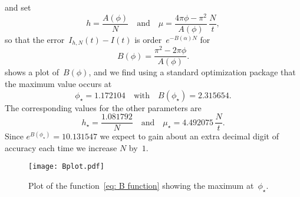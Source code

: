 \documentclass[12pt,a4paper]{article}
\begin{document}
and set
\[
h=\frac{A(\phi)}{N}\quad\text{and}\quad
\mu=\frac{4\pi\phi-\pi^2}{A(\phi)}\,\frac{N}{t},
\]
so that the error~$I_{h,N}(t)-I(t)$ is order~$e^{-B(\alpha)N}$ for
\begin{equation}\label{eq: B function}
B(\phi)=\frac{\pi^2-2\pi\phi}{A(\phi)}.
\end{equation}
 shows a plot of~$B(\phi)$, and we find using a standard 
optimization package that the maximum value occurs at
\[
\phi_\star=1.172104\quad\text{with}\quad B(\phi_\star)=2.315654.
\]
The corresponding values for the other parameters are
\[
h_\star=\frac{1.081792}{N}\quad\text{and}\quad
\mu_\star=4.492075\,\frac{N}{t}.
\]
Since $e^{B(\phi_\star)}=10.131547$ we expect to gain about an extra decimal
digit of accuracy each time we increase $N$ by~$1$.



\begin{figure}
\caption{Plot of the function~\eqref{eq: B function} showing the 
maximum at~$\phi_\star$.}\label{fig: B plot}
\begin{center}
\texttt{[image: Bplot.pdf]}
\end{center}
\end{figure}












\end{document}
